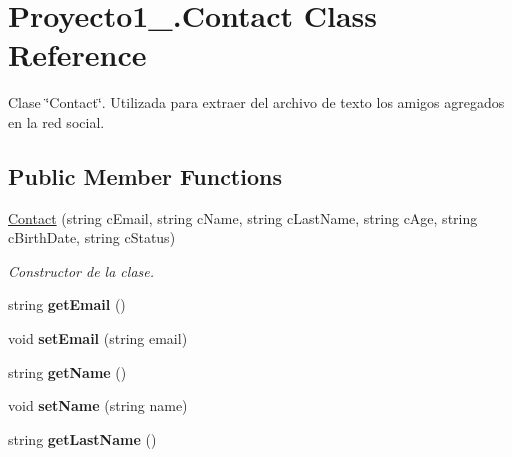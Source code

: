 \hypertarget{class_proyecto1__1096917_1_1_contact}{}\section{Proyecto1\+\_.\+Contact Class Reference}
\label{class_proyecto1__1096917_1_1_contact}


Clase \char`\"{}\+Contact\char`\"{}. Utilizada para extraer del archivo de texto los amigos agregados en la red social.  


\subsection*{Public Member Functions}
\begin{DoxyCompactItemize}
\item 
\mbox{\hyperlink{class_proyecto1__1096917_1_1_contact_a83ff88131cf40e76a7897a1fadcaa679}{Contact}} (string c\+Email, string c\+Name, string c\+Last\+Name, string c\+Age, string c\+Birth\+Date, string c\+Status)
\begin{DoxyCompactList}\small\item\em Constructor de la clase. \end{DoxyCompactList}\item 
\mbox{\label{class_proyecto1__1096917_1_1_contact_aafbea71ed93e81b92e2946e94432f4b4}} 
string {\bfseries get\+Email} ()
\item 
\mbox{\label{class_proyecto1__1096917_1_1_contact_a4633112f241b8aeb6469f3d63ad286a1}} 
void {\bfseries set\+Email} (string email)
\item 
\mbox{\label{class_proyecto1__1096917_1_1_contact_a2ccfe34c7e28c6953d70260d00ce9289}} 
string {\bfseries get\+Name} ()
\item 
\mbox{\label{class_proyecto1__1096917_1_1_contact_a3e594e72637ba39fc36b2e046642cee4}} 
void {\bfseries set\+Name} (string name)
\item 
\mbox{\label{class_proyecto1__1096917_1_1_contact_a391606fb83c64b79fb1e485bf252b3a5}} 
string {\bfseries get\+Last\+Name} ()

\end{DoxyCompactItemize}
